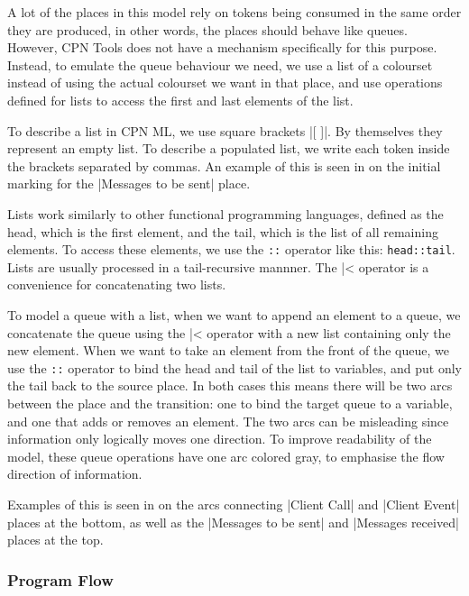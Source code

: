 		A lot of the places in this model rely on tokens being consumed in the same
		order they are produced, in other words, the places should behave like queues.
		However, CPN Tools does not have a mechanism specifically for this purpose.
		Instead, to emulate the queue behaviour we need, we use a list of a colourset
		instead of using the actual colourset we want in that place, and use
		operations defined for lists to access the first and last elements of the
		list.
		
		To describe a list in CPN ML, we use square brackets |[ ]|. By themselves
		they represent an empty list. To describe a populated list, we write each
		token inside the brackets separated by commas. An example of this is seen in
		 on the initial marking for the |Messages to be sent|
		place.
		
		Lists work similarly to other functional programming languages, defined as
		the head, which is the first element, and the tail, which is the list of all
		remaining elements. To access these elements, we use the \lstinline-::-
		operator like this:	\lstinline-head::tail-. Lists are usually processed in a
		tail-recursive mannner. The |^^| operator is a convenience for concatenating
		two lists.
		
		To model a queue with a list, when we want to append an
		element to a queue, we concatenate the queue using the |^^| operator with a
		new list containing only the new element. When we want to take an element from the front
		of the queue, we use the \lstinline-::- operator to bind the head and tail of the list to variables,
		and put only the tail back to the source place. In both cases this means there
		will be two arcs between the place and the transition: one to bind the
		target queue to a variable, and one that adds or removes an element. The two
		arcs can be misleading since information only logically moves one direction.
		To improve readability of the model, these queue operations have one arc
		colored gray, to emphasise the flow direction of information.
		
		Examples of this is seen in  on the arcs connecting
		|Client Call| and |Client Event| places at the bottom, as well as the
		|Messages to be sent| and |Messages received| places at the top.

	\subsubsection{Program Flow}
	
